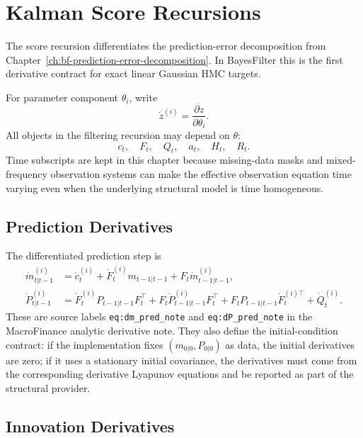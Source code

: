 \chapter{Kalman Score Recursions}
\label{ch:bf-kalman-score}

The score recursion differentiates the prediction-error decomposition from
Chapter~\ref{ch:bf-prediction-error-decomposition}.  In BayesFilter this is the
first derivative contract for exact linear Gaussian HMC targets.

For parameter component $\theta_i$, write
\[
  \dot z^{(i)} = \frac{\partial z}{\partial \theta_i}.
\]
All objects in the filtering recursion may depend on $\theta$:
\[
  c_t,\quad F_t,\quad Q_t,\quad a_t,\quad H_t,\quad R_t.
\]
Time subscripts are kept in this chapter because missing-data masks and
mixed-frequency observation systems can make the effective observation equation
time varying even when the underlying structural model is time homogeneous.

\section{Prediction Derivatives}
\label{sec:bf-score-prediction-derivatives}

The differentiated prediction step is
\begin{align}
\label{eq:bf-score-predicted-mean-first}
  \dot m_{t|t-1}^{(i)}
  &=
  \dot c_t^{(i)}
  +\dot F_t^{(i)}m_{t-1|t-1}
  +F_t\dot m_{t-1|t-1}^{(i)},\\
\label{eq:bf-score-predicted-cov-first}
  \dot P_{t|t-1}^{(i)}
  &=
  \dot F_t^{(i)}P_{t-1|t-1}F_t^\top
  +F_t\dot P_{t-1|t-1}^{(i)}F_t^\top
  +F_tP_{t-1|t-1}\dot F_t^{(i)\top}
  +\dot Q_t^{(i)}.
\end{align}
These are source labels \texttt{eq:dm\_pred\_note} and
\texttt{eq:dP\_pred\_note} in the MacroFinance analytic derivative note.  They
also define the initial-condition contract: if the implementation fixes
$(m_{0|0},P_{0|0})$ as data, the initial derivatives are zero; if it uses a
stationary initial covariance, the derivatives must come from the corresponding
derivative Lyapunov equations and be reported as part of the structural
provider.

\section{Innovation Derivatives}
\label{sec:bf-score-innovation-derivatives}

